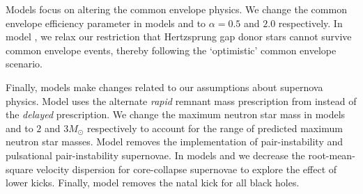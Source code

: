 Models \modRangeCE{} focus on altering the common envelope physics. We change the common envelope efficiency parameter in models \modAlphaLow{} and \modAlphaHigh{} to $\alpha = 0.5$ and $2.0$ respectively. In model \modOpt, we relax our restriction that Hertzsprung gap donor stars cannot survive common envelope events, thereby following the `optimistic' common envelope scenario.

Finally, models \modRangeSN{} make changes related to our assumptions about supernova physics. Model \modRapid{} uses the alternate \textit{rapid} remnant mass prescription from \citet{Fryer+2012} instead of the \textit{delayed} prescription. We change the maximum neutron star mass in models \modNSLow{} and \modNSHigh{} to $2$ and $3 \unit{M_{\odot}}$ respectively to account for the range of predicted maximum neutron star masses. Model \modNoPISN{} removes the implementation of pair-instability and pulsational pair-instability supernovae. In models \modSigLow{} and \modSigLower{} we decrease the root-mean-square velocity dispersion for core-collapse supernovae to explore the effect of lower kicks. Finally, model \modNoBH{} removes the natal kick for all black holes.

